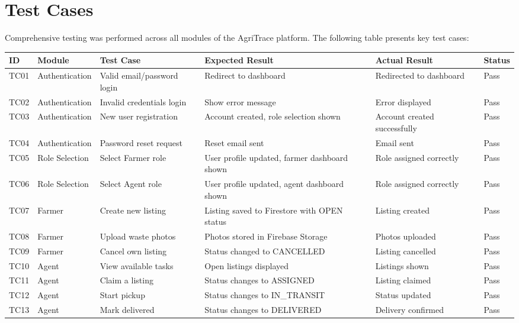 \documentclass[a4paper,12pt,oneside]{report}
\begin{document}
\section{Test Cases}

\noindent Comprehensive testing was performed across all modules of the AgriTrace platform. The following table presents key test cases:

\small
\begin{longtable}{|C{0.9cm}|L{2.2cm}|L{2.6cm}|L{3.2cm}|L{3.2cm}|C{1.1cm}|}
\hline
\textbf{ID} & \textbf{Module} & \textbf{Test Case} & \textbf{Expected Result} & \textbf{Actual Result} & \textbf{Status} \\
\hline
\endhead
TC01 & Authentication & Valid email/password login & Redirect to dashboard & Redirected to dashboard & Pass \\
\hline
TC02 & Authentication & Invalid credentials login & Show error message & Error displayed & Pass \\
\hline
TC03 & Authentication & New user registration & Account created, role selection shown & Account created successfully & Pass \\
\hline
TC04 & Authentication & Password reset request & Reset email sent & Email sent & Pass \\
\hline
TC05 & Role Selection & Select Farmer role & User profile updated, farmer dashboard shown & Role assigned correctly & Pass \\
\hline
TC06 & Role Selection & Select Agent role & User profile updated, agent dashboard shown & Role assigned correctly & Pass \\
\hline
TC07 & Farmer & Create new listing & Listing saved to Firestore with OPEN status & Listing created & Pass \\
\hline
TC08 & Farmer & Upload waste photos & Photos stored in Firebase Storage & Photos uploaded & Pass \\
\hline
TC09 & Farmer & Cancel own listing & Status changed to CANCELLED & Listing cancelled & Pass \\
\hline
TC10 & Agent & View available tasks & Open listings displayed & Listings shown & Pass \\
\hline
TC11 & Agent & Claim a listing & Status changes to ASSIGNED & Listing claimed & Pass \\
\hline
TC12 & Agent & Start pickup & Status changes to IN\_TRANSIT & Status updated & Pass \\
\hline
TC13 & Agent & Mark delivered & Status changes to DELIVERED & Delivery confirmed & Pass \\

\end{longtable}
\end{document}
